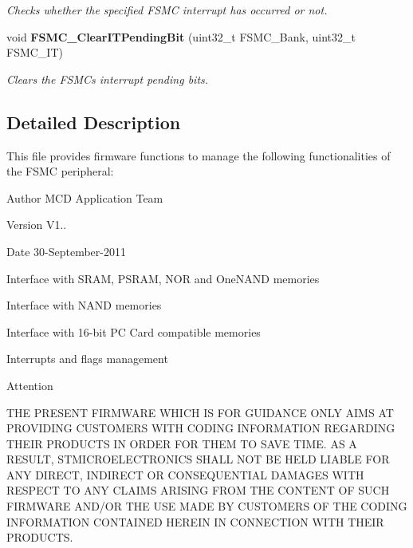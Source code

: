 \begin{DoxyCompactItemize}
\begin{DoxyCompactList}\small\item\em Checks whether the specified F\+S\+MC interrupt has occurred or not. \end{DoxyCompactList}\item 
void \textbf{ F\+S\+M\+C\+\_\+\+Clear\+I\+T\+Pending\+Bit} (uint32\+\_\+t F\+S\+M\+C\+\_\+\+Bank, uint32\+\_\+t F\+S\+M\+C\+\_\+\+IT)
\begin{DoxyCompactList}\small\item\em Clears the F\+S\+MC\textquotesingle{}s interrupt pending bits. \end{DoxyCompactList}\end{DoxyCompactItemize}


\subsection{Detailed Description}
This file provides firmware functions to manage the following functionalities of the F\+S\+MC peripheral\+: 

\begin{DoxyAuthor}{Author}
M\+CD Application Team 
\end{DoxyAuthor}
\begin{DoxyVersion}{Version}
V1.. 
\end{DoxyVersion}
\begin{DoxyDate}{Date}
30-\/\+September-\/2011
\begin{DoxyItemize}
\item Interface with S\+R\+AM, P\+S\+R\+AM, N\+OR and One\+N\+A\+ND memories
\item Interface with N\+A\+ND memories
\item Interface with 16-\/bit PC Card compatible memories
\item Interrupts and flags management
\end{DoxyItemize}
\end{DoxyDate}
\begin{DoxyAttention}{Attention}

\end{DoxyAttention}
T\+HE P\+R\+E\+S\+E\+NT F\+I\+R\+M\+W\+A\+RE W\+H\+I\+CH IS F\+OR G\+U\+I\+D\+A\+N\+CE O\+N\+LY A\+I\+MS AT P\+R\+O\+V\+I\+D\+I\+NG C\+U\+S\+T\+O\+M\+E\+RS W\+I\+TH C\+O\+D\+I\+NG I\+N\+F\+O\+R\+M\+A\+T\+I\+ON R\+E\+G\+A\+R\+D\+I\+NG T\+H\+E\+IR P\+R\+O\+D\+U\+C\+TS IN O\+R\+D\+ER F\+OR T\+H\+EM TO S\+A\+VE T\+I\+ME. AS A R\+E\+S\+U\+LT, S\+T\+M\+I\+C\+R\+O\+E\+L\+E\+C\+T\+R\+O\+N\+I\+CS S\+H\+A\+LL N\+OT BE H\+E\+LD L\+I\+A\+B\+LE F\+OR A\+NY D\+I\+R\+E\+CT, I\+N\+D\+I\+R\+E\+CT OR C\+O\+N\+S\+E\+Q\+U\+E\+N\+T\+I\+AL D\+A\+M\+A\+G\+ES W\+I\+TH R\+E\+S\+P\+E\+CT TO A\+NY C\+L\+A\+I\+MS A\+R\+I\+S\+I\+NG F\+R\+OM T\+HE C\+O\+N\+T\+E\+NT OF S\+U\+CH F\+I\+R\+M\+W\+A\+RE A\+N\+D/\+OR T\+HE U\+SE M\+A\+DE BY C\+U\+S\+T\+O\+M\+E\+RS OF T\+HE C\+O\+D\+I\+NG I\+N\+F\+O\+R\+M\+A\+T\+I\+ON C\+O\+N\+T\+A\+I\+N\+ED H\+E\+R\+E\+IN IN C\+O\+N\+N\+E\+C\+T\+I\+ON W\+I\+TH T\+H\+E\+IR P\+R\+O\+D\+U\+C\+TS.

